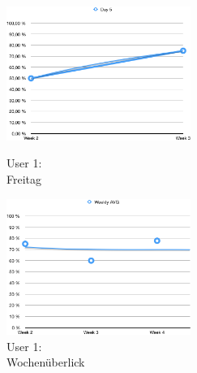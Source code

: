 \begin{figure}[t!]
    \centering
    \parbox{6cm}{
    \includegraphics[width=6cm]{./Abbildungen/Kapitel_04/usr1day5.png}
    \caption{User 1: \\Freitag}
    \label{img:usr1day5}}
    \qquad
    \begin{minipage}{6cm}
    \includegraphics[width=6cm]{./Abbildungen/Kapitel_04/usr1wa.png}
    \caption{User 1: \\Wochenüberlick}
    \label{img:usr1wa}
    \end{minipage}
\end{figure}
    


\clearpage
\newpage

